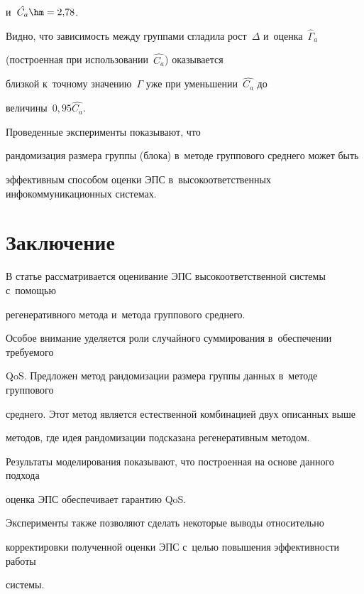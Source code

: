 и~$\hat{C_a}\hm=2{,}78$.


Видно, что зависимость между группами  сгладила  рост~$\Delta$ и~оценка~$\hat{\Gamma}_a$ 


(построенная при использовании~$\hat{C_a}$) оказывается  


близкой  к~точному значению~$\Gamma$  уже при уменьшении~$\hat{C_a}$ до 


величины~$0{,}95\hat{C_a}$.








Проведенные   эксперименты показывают, что


рандомизация размера группы  (блока) в~методе группового среднего может быть  


эффективным способом оценки ЭПС в~высокоответственных инфокоммуникационных  системах.





    


\section*{Заключение}





В статье рассматривается  оценивание ЭПС  высокоответственной системы с~помощью 


регенеративного метода и~метода группового среднего.


Особое внимание уделяется роли случайного суммирования в~обеспечении требуемого


QoS.  Предложен метод рандомизации размера группы данных в~методе группового 


среднего. Этот метод является естественной комбинацией  двух описанных выше  


методов, где идея рандомизации подсказана регенеративным методом.


Результаты моделирования показывают, что построенная на основе данного подхода  


оценка ЭПС  обеспечивает  гарантию QoS.


 Эксперименты также позволяют сделать некоторые выводы  относительно 


корректировки полученной оценки   ЭПС  с~целью повышения эффективности работы 


системы.









